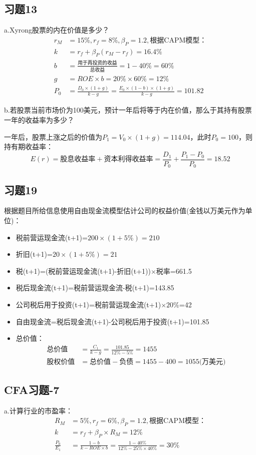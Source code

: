 \documentclass{article}
\begin{document}
\subsection*{习题13}
a.Xyrong股票的内在价值是多少？
\begin{align}
    r_M&=15\%,r_f=8\%,\beta_P=1.2,\text{根据CAPM模型：}\\
    k&=r_f+\beta_P(r_M-r_f)=16.4\%\\
    b&=\frac{\text{用于再投资的收益}}{\text{总收益}}=1-40\%=60\%\\
    g&=ROE\times b=20\%\times 60\%=12\%\\
    P_0&=\frac{D_0\times (1+g)}{k-g}=\frac{E_0\times(1-b)\times(1+g)}{k-g}=101.82
\end{align}

b.若股票当前市场价为100美元，预计一年后将等于内在价值，那么于其持有股票一年的收益率为多少？

一年后，股票上涨之后的价值为$P_1=V_0\times(1+g)=114.04$，此时$P_0=100 $，则持有期收益率：
\[E(r)=\text{股息收益率}+\text{资本利得收益率}=\frac{D_1}{P_0}+\frac{P_1-P_0}{P_0}=18.52\]
\subsection*{习题19}
根据题目所给信息使用自由现金流模型估计公司的权益价值(金钱以万美元作为单位)：
\begin{itemize}
    \item 税前营运现金流(t+1)=$200\times (1+5\%)=210$
    \item 折旧(t+1)=$20\times (1+5\%)=21$
    \item 税(t+1)=(税前营运现金流(t+1)-折旧(t+1))$\times$税率=661.5
    \item 税后现金流(t+1)=税前营运现金流-税(t+1)=143.85
    \item 公司税后用于投资(t+1)=税前营运现金流(t+1)$\times 20\%$=42
    \item 自由现金流=税后现金流(t+1)-公司税后用于投资(t+1)=101.85
    \item 总价值：
    \begin{align}
        \text{总价值}&=\frac{C_1}{k-g}=\frac{101.85}{12\%-5\%}=1455\\
        \text{股权价值}&=\text{总价值}-\text{负债}=1455-400=1055 \text{(万美元)}
    \end{align}    
\end{itemize}
\subsection*{CFA习题-7}
a.计算行业的市盈率：
\begin{align}
    R_M&=5\%,r_f=6\%,\beta_P=1.2,\text{根据CAPM模型：}\\
    k&=r_f+\beta_P\times R_M=12\%\\
    \frac{P_0}{E_1}&=\frac{1-b}{k-ROE\times b}=\frac{1-40\%}{12\%-25\%\times 40\%}=30\%
\end{align}
\end{document}

